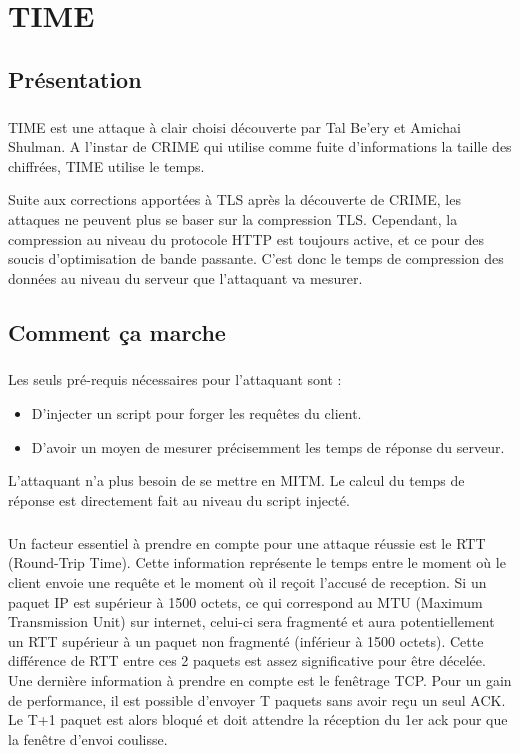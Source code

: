 \chapter{TIME}
\label{chapter:time}


\section{Présentation}
\paragraph{}
TIME est une attaque à clair choisi découverte par Tal Be'ery et Amichai Shulman. A l'instar de CRIME qui utilise comme fuite d'informations la taille des chiffrées, TIME utilise le temps.

Suite aux corrections apportées à TLS après la découverte de CRIME, les attaques ne peuvent plus se baser sur la compression TLS. Cependant, la compression au niveau du protocole HTTP est toujours active, et ce pour des soucis d'optimisation de bande passante. C'est donc le temps de compression des données au niveau du serveur que l'attaquant va mesurer.

\section{Comment ça marche}
\paragraph{}
Les seuls pré-requis nécessaires pour l'attaquant sont :
\begin{itemize}
  \item D'injecter un script pour forger les requêtes du client.
  \item D'avoir un moyen de mesurer précisemment les temps de réponse du serveur.
\end{itemize}

L'attaquant n'a plus besoin de se mettre en MITM. Le calcul du temps de réponse est directement fait au niveau du script injecté.

\paragraph{}
Un facteur essentiel à prendre en compte pour une attaque réussie est le RTT (Round-Trip Time). Cette information représente le temps entre le moment où le client envoie une requête et le moment où il reçoit l'accusé de reception. Si un paquet IP est supérieur à 1500 octets, ce qui correspond au MTU (Maximum Transmission Unit) sur internet, celui-ci  sera fragmenté et aura potentiellement un RTT supérieur à un paquet non fragmenté (inférieur à 1500 octets). Cette différence de RTT entre ces 2 paquets est assez significative pour être décelée. Une dernière information à prendre en compte est le fenêtrage TCP. Pour un gain de performance, il est possible d'envoyer T paquets sans avoir reçu un seul ACK. Le T+1 paquet est alors bloqué et doit attendre la réception du 1er ack pour que la fenêtre d'envoi coulisse.\\

